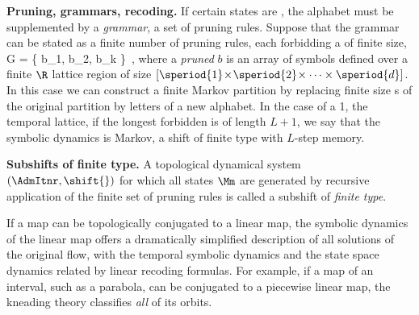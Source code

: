 {\bf Pruning, grammars, recoding.}
If certain states are {\inadmissible}, the alphabet must be supplemented by a
{\em grammar},
a set of pruning rules.
Suppose that
the grammar can be stated as a finite number of pruning rules, each
forbidding a {\brick} of finite size,
\beq
 {\cal G} = \left\{
        b_1, b_2, \cdots b_k
        \right\}
\,,
where a {\em pruned {\brick}} $b$ is an array of symbols defined over a
finite $\R$ lattice region of size
$[\speriod{1}\!\times\!\speriod{2}\!\times\cdots\times\speriod{d}]$. In
this case we can construct a finite Markov partition by replacing finite
size \brick s of the original partition by letters of a new alphabet. In
the case of a 1\dmn, the temporal lattice, if the longest forbidden {\brick}
is of length $L+1$, we say that the symbolic dynamics is Markov, a shift
of finite type with {$L$-step memory}.

{\bf Subshifts of finite type.}
A {topological dynamical system} $(\AdmItnr,\shift{})$ for which all
{\admissible} states $\Mm$ are generated by recursive application
of the finite set of pruning rules 
is called a subshift of {\em finite type}.

                                            \toCB %
If a map can be topologically conjugated to a linear map, the symbolic
dynamics of the linear map offers a dramatically simplified description
of all {\admissible} solutions of the original flow, with the temporal
symbolic dynamics and the state space dynamics related by linear recoding
formulas. For example, if a map of an interval, such as a parabola, can
be conjugated to a piecewise linear map, the kneading theory
classifies \emph{all} of its {\admissible} orbits.

\renewcommand{\statesp}{phase space}
\renewcommand{\Statesp}{Phase space}
\renewcommand{\stateDsp}{phase-space}
\renewcommand{\StateDsp}{Phase-space}
